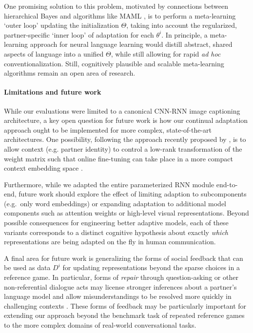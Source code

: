 \documentclass[11pt,a4paper]{article}
\begin{document}
One promising solution to this problem, motivated by connections between hierarchical Bayes and algorithms like MAML \cite{finn2017model,grant_recasting_2018,nagabandi_deep_2018}, is to perform a meta-learning `outer loop' updating the initialization $\Theta$, taking into account the regularized, partner-specific `inner loop' of adaptation for each $\theta^i$.
In principle, a meta-learning approach for neural language learning would distill abstract, shared aspects of language into a unified $\Theta$, while still allowing for rapid \emph{ad hoc} conventionalization.
Still, cognitively plausible and scalable meta-learning algorithms remain an open area of research.


\paragraph{Limitations and future work}

While our evaluations were limited to a canonical CNN-RNN image captioning architecture, a key open question for future work is how our continual adaptation approach ought to be implemented for more complex, state-of-the-art architectures. 
One possibility, following the approach recently proposed by \citet{jaech_low-rank_2017}, is to allow context (e.g. partner identity) to control a low-rank transformation of the weight matrix such that online fine-tuning can take place in a more compact context embedding space \cite{jaech_personalized_2018}.

Furthermore, while we adapted the entire parameterized RNN module end-to-end, future work should explore the effect of limiting adaption to subcomponents (e.g.\ only word embeddings) or expanding adaptation to additional model components such as attention weights or high-level visual representations.
Beyond possible consequences for engineering better adaptive models, each of these variants corresponds to a distinct cognitive hypothesis about exactly \emph{which} representations are being adapted on the fly in human communication.

A final area for future work is generalizing the forms of social feedback that can be used as data $D^i$ for updating representations beyond the sparse choices in a reference game.
In particular, forms of \emph{repair} through question-asking or other non-referential dialogue acts may license stronger inferences about a partner's language model and allow misunderstandings to be resolved more quickly in challenging contexts \cite{drew1997open,DingemanseEtAl15_RepairUniversal,li2016learning}.
These forms of feedback may be particularly important for extending our approach beyond the benchmark task of repeated reference games to the more complex domains of real-world conversational tasks.
\end{document}
